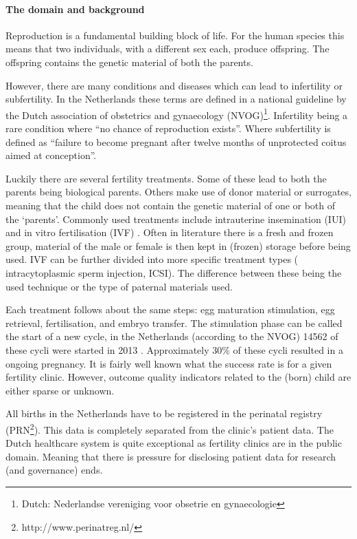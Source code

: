 
\paragraph{The domain and background}
Reproduction is a fundamental building block of life.
For the human species this means that two individuals, with a different sex each, produce offspring.
The offspring contains the genetic material of both the parents.

However, there are many conditions and diseases which can lead to infertility or subfertility.
In the Netherlands these terms are defined in a national guideline by the Dutch association of obstetrics and gynaecology (NVOG)\footnote{Dutch: Nederlandse vereniging voor obsetrie en gynaecologie}\cite{subfertilityGuideline}.
Infertility being a rare condition where ``no chance of reproduction exists''.
Where subfertility is defined as ``failure to become pregnant after twelve months of unprotected coitus aimed at conception''.

Luckily there are several fertility treatments.
Some of these lead to both the parents being biological parents. 
Others make use of donor material or surrogates, meaning that the child does not contain the genetic material of one or both of the `parents'.
Commonly used treatments include intrauterine insemination (IUI) and in vitro fertilisation (IVF) \cite{treatmentExplanation}.
Often in literature there is a fresh and frozen group, material of the male or female is then kept in (frozen) storage before being used.
IVF can be further divided into more specific treatment types (\eg{} intracytoplasmic sperm injection, ICSI).
The difference between these being the used technique or the type of paternal materials used.

Each treatment follows about the same steps: egg maturation stimulation, egg retrieval, fertilisation, and embryo transfer.
The stimulation phase can be called the start of a new cycle, in the Netherlands (according to the NVOG) 14562 of these cycli were started in 2013 \cite{ivfReportNVOG2013}.
Approximately 30\% of these cycli resulted in a ongoing pregnancy.
It is fairly well known what the success rate is for a given fertility clinic.
However, outcome quality indicators related to the (born) child are either sparse or unknown.

All births in the Netherlands have to be registered in the perinatal registry (PRN\footnote{http://www.perinatreg.nl/}).
This data is completely separated from the clinic's patient data.
The Dutch healthcare system is quite exceptional as fertility clinics are in the public domain.
Meaning that there is pressure for disclosing patient data for research (and governance) ends.

